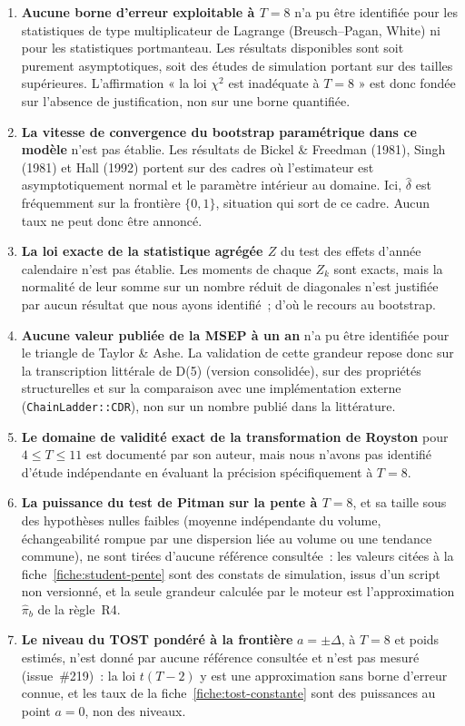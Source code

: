 \documentclass[a4paper,11pt]{article}
\newcommand{\code}[1]{\texttt{\small #1}}
\begin{document}
\begin{enumerate}[itemsep=3pt]
  \item \textbf{Aucune borne d'erreur exploitable à $T = 8$} n'a pu être
  identifiée pour les statistiques de type multiplicateur de Lagrange
  (Breusch--Pagan, White) ni pour les statistiques portmanteau. Les résultats
  disponibles sont soit purement asymptotiques, soit des études de simulation
  portant sur des tailles supérieures. L'affirmation « la loi $\chi^2$ est
  inadéquate à $T = 8$ » est donc fondée sur l'absence de justification, non sur
  une borne quantifiée.
  \item \textbf{La vitesse de convergence du bootstrap paramétrique dans ce
  modèle} n'est pas établie. Les résultats de Bickel \& Freedman (1981), Singh
  (1981) et Hall (1992) portent sur des cadres où l'estimateur est
  asymptotiquement normal et le paramètre intérieur au domaine. Ici,
  $\hat\delta$ est fréquemment sur la frontière $\{0,1\}$, situation qui sort de
  ce cadre. Aucun taux ne peut donc être annoncé.
  \item \textbf{La loi exacte de la statistique agrégée $Z$} du test des effets
  d'année calendaire n'est pas établie. Les moments de chaque $Z_k$ sont exacts,
  mais la normalité de leur somme sur un nombre réduit de diagonales n'est
  justifiée par aucun résultat que nous ayons identifié~; d'où le recours au
  bootstrap.
  \item \textbf{Aucune valeur publiée de la MSEP à un an} n'a pu être identifiée
  pour le triangle de Taylor \& Ashe. La validation de cette grandeur repose donc
  sur la transcription littérale de D(5) (version consolidée), sur des propriétés
  structurelles et sur la comparaison avec une implémentation externe
  (\code{ChainLadder::CDR}), non sur un nombre publié dans la littérature.
  \item \textbf{Le domaine de validité exact de la transformation de Royston}
  pour $4 \le T \le 11$ est documenté par son auteur, mais nous n'avons pas
  identifié d'étude indépendante en évaluant la précision spécifiquement à
  $T = 8$.
  \item \textbf{La puissance du test de Pitman sur la pente à $T = 8$}, et sa
  taille sous des hypothèses nulles faibles (moyenne indépendante du volume,
  échangeabilité rompue par une dispersion liée au volume ou une tendance commune),
  ne sont tirées d'aucune référence consultée~: les valeurs citées à la
  fiche~\ref{fiche:student-pente} sont des constats de simulation, issus d'un script
  non versionné, et la seule grandeur calculée par le moteur est l'approximation
  $\hat\pi_b$ de la règle~R4.
  \item \textbf{Le niveau du TOST pondéré à la frontière} $a = \pm\Delta$, à
  $T = 8$ et poids estimés, n'est donné par aucune référence consultée et n'est pas
  mesuré (issue~\#219)~: la loi $t(T-2)$ y est une approximation sans borne d'erreur
  connue, et les taux de la fiche~\ref{fiche:tost-constante} sont des puissances au
  point $a = 0$, non des niveaux.
\end{enumerate}
\end{document}
